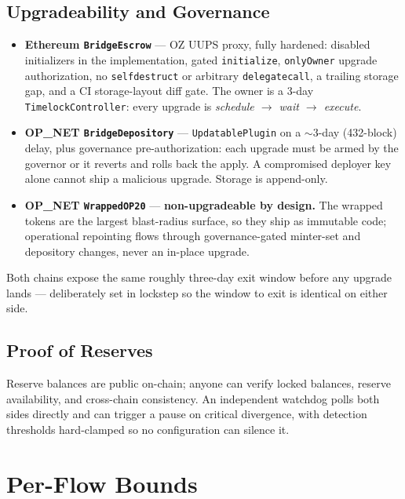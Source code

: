 \documentclass[11pt,a4paper]{article}
\begin{document}
\subsection{Upgradeability and Governance}

\begin{itemize}
  \item \textbf{Ethereum \texttt{BridgeEscrow}} --- OZ UUPS proxy, fully hardened: disabled initializers in the implementation, gated \texttt{initialize}, \texttt{onlyOwner} upgrade authorization, no \texttt{selfdestruct} or arbitrary \texttt{delegatecall}, a trailing storage gap, and a CI storage-layout diff gate. The owner is a 3-day \texttt{TimelockController}: every upgrade is \emph{schedule $\rightarrow$ wait $\rightarrow$ execute}.
  \item \textbf{OP\_NET \texttt{BridgeDepository}} --- \texttt{UpdatablePlugin} on a $\sim$3-day (432-block) delay, plus governance pre-authorization: each upgrade must be armed by the governor or it reverts and rolls back the apply. A compromised deployer key alone cannot ship a malicious upgrade. Storage is append-only.
  \item \textbf{OP\_NET \texttt{WrappedOP20}} --- \textbf{non-upgradeable by design.} The wrapped tokens are the largest blast-radius surface, so they ship as immutable code; operational repointing flows through governance-gated minter-set and depository changes, never an in-place upgrade.
\end{itemize}

Both chains expose the same roughly three-day exit window before any upgrade lands --- deliberately set in lockstep so the window to exit is identical on either side.

\subsection{Proof of Reserves}

Reserve balances are public on-chain; anyone can verify locked balances, reserve availability, and cross-chain consistency. An independent watchdog polls both sides directly and can trigger a pause on critical divergence, with detection thresholds hard-clamped so no configuration can silence it.

\section{Per-Flow Bounds}
\end{document}
